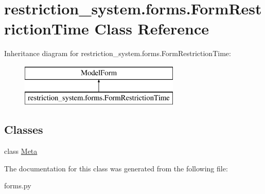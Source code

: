 \hypertarget{classrestriction__system_1_1forms_1_1FormRestrictionTime}{}\section{restriction\+\_\+system.\+forms.\+Form\+Restriction\+Time Class Reference}
\label{classrestriction__system_1_1forms_1_1FormRestrictionTime}
Inheritance diagram for restriction\+\_\+system.\+forms.\+Form\+Restriction\+Time\+:\begin{figure}[H]
\begin{center}
\leavevmode
\includegraphics[height=2.000000cm]{classrestriction__system_1_1forms_1_1FormRestrictionTime}
\end{center}
\end{figure}
\subsection*{Classes}
\begin{DoxyCompactItemize}
\item 
class \hyperlink{classrestriction__system_1_1forms_1_1FormRestrictionTime_1_1Meta}{Meta}
\end{DoxyCompactItemize}


The documentation for this class was generated from the following file\+:\begin{DoxyCompactItemize}
\item 
forms.\+py\end{DoxyCompactItemize}
